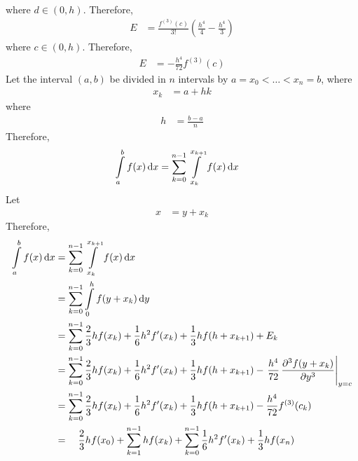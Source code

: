\documentclass[fleqn, a4paper, 12pt, twoside]{article}
\theoremstyle{definition}
\theoremstyle{theorem}
\begin{document}
\begin{solution}
	where $d \in (0,h)$.
	Therefore,
	\begin{align*}
		E & = \frac{f^{(3)}(c)}{3!} \left( \frac{h^4}{4} - \frac{h^4}{3} \right)
	\end{align*}
	where $c \in (0,h)$.
	Therefore,
	\begin{align*}
		E & = -\frac{h^4}{72} f^{(3)}(c)
	\end{align*}
	Let the interval $(a,b)$ be divided in $n$ intervals by $a = x_0 < \dots < x_n = b$, where
	\begin{align*}
		x_k & = a + h k
	\end{align*}
	where
	\begin{align*}
		h & = \frac{b - a}{n}
	\end{align*}
	Therefore,
	\begin{align*}
		\int\limits_{a}^{b} f(x) \dif x & = \sum\limits_{k = 0}^{n - 1} \int\limits_{x_k}^{x_{k + 1}} f(x) \dif x
	\end{align*}
	Let
	\begin{align*}
		x & = y + x_k
	\end{align*}
	Therefore,
	\begin{align*}
		\int\limits_{a}^{b} f(x) \dif x & = \sum\limits_{k = 0}^{n - 1} \int\limits_{x_k}^{x_{k + 1}} f(x) \dif x                                                                                                      \\
                                                & = \sum\limits_{k = 0}^{n - 1} \int\limits_{0}^{h} f(y + x_k) \dif y                                                                                                          \\
                                                & = \sum\limits_{k = 0}^{n - 1} \frac{2}{3} h f(x_k) + \frac{1}{6} h^2 f'(x_k) + \frac{1}{3} h f(h + x_{k + 1}) + E_k                                                          \\
                                                & = \sum\limits_{k = 0}^{n - 1} \frac{2}{3} h f(x_k) + \frac{1}{6} h^2 f'(x_k) + \frac{1}{3} h f(h + x_{k + 1}) - \left. \frac{h^4}{72} \dpd[3]{f(y + x_k)}{y} \right|_{y = c} \\
                                                & = \sum\limits_{k = 0}^{n - 1} \frac{2}{3} h f(x_k) + \frac{1}{6} h^2 f'(x_k) + \frac{1}{3} h f(h + x_{k + 1}) - \frac{h^4}{72} f^{(3)}(c_k)                                  \\
                                                & = \quad \frac{2}{3} h f(x_0) + \sum\limits_{k = 1}^{n - 1} h f(x_k) + \sum\limits_{k = 0}^{n - 1} \frac{1}{6} h^2 f'(x_k) + \frac{1}{3} h f(x_n)                             \\

\end{align*}
\end{solution}
\end{document}
